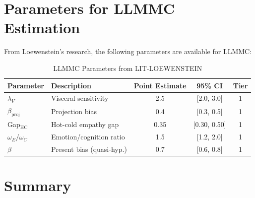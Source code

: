 \section{Parameters for LLMMC Estimation}
\label{sec:lo-llmmc}

From Loewenstein's research, the following parameters are available for LLMMC:

\begin{table}[htbp]
\centering
\caption{LLMMC Parameters from LIT-LOEWENSTEIN}
\label{tab:lo-llmmc}
\renewcommand{\arraystretch}{1.3}
\begin{tabular}{@{}llccc@{}}
\toprule
\textbf{Parameter} & \textbf{Description} & \textbf{Point Estimate} & \textbf{95\% CI} & \textbf{Tier} \\
\midrule
$\lambda_V$ & Visceral sensitivity & 2.5 & [2.0, 3.0] & 1 \\
$\beta_{\text{proj}}$ & Projection bias & 0.4 & [0.3, 0.5] & 1 \\
Gap$_{\text{HC}}$ & Hot-cold empathy gap & 0.35 & [0.30, 0.50] & 1 \\
$\omega_E / \omega_C$ & Emotion/cognition ratio & 1.5 & [1.2, 2.0] & 1 \\
$\beta$ & Present bias (quasi-hyp.) & 0.7 & [0.6, 0.8] & 1 \\
\bottomrule
\end{tabular}
\end{table}


\section{Summary}
\label{sec:lo-summary}

